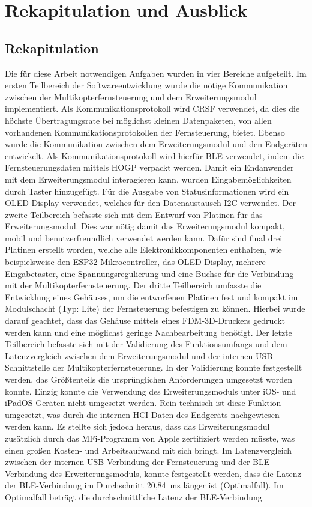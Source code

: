 
\chapter{Rekapitulation und Ausblick}
\section{Rekapitulation}

Die für diese Arbeit notwendigen Aufgaben wurden in vier Bereiche aufgeteilt. Im ersten Teilbereich der Softwareentwicklung wurde die nötige Kommunikation zwischen der Multikopterfernsteuerung und dem Erweiterungsmodul implementiert. Als Kommunikationsprotokoll wird CRSF verwendet, da dies die höchste Übertragungsrate bei möglichst kleinen Datenpaketen, von allen vorhandenen Kommunikationsprotokollen der Fernsteuerung, bietet. Ebenso wurde die Kommunikation zwischen dem Erweiterungsmodul und den Endgeräten entwickelt. Als Kommunikationsprotokoll wird hierfür \ac{BLE} verwendet, indem die Fernsteuerungsdaten mittels \ac{HOGP} verpackt werden. Damit ein Endanwender mit dem Erweiterungsmodul interagieren kann, wurden Eingabemöglichkeiten durch Taster hinzugefügt. Für die Ausgabe von Statusinformationen wird ein \acs{OLED}-Display verwendet, welches für den Datenaustausch \ac{I2C} verwendet. Der zweite Teilbereich befasste sich mit dem Entwurf von Platinen für das Erweiterungsmodul. Dies war nötig damit das Erweiterungsmodul kompakt, mobil und benutzerfreundlich verwendet werden kann. Dafür sind final drei Platinen erstellt worden, welche alle Elektronikkomponenten enthalten, wie beispielsweise den ESP32-Mikrocontroller, das \acs{OLED}-Display, mehrere Eingabetaster, eine Spannungsregulierung und eine Buchse für die Verbindung mit der Multikopterfernsteuerung. Der dritte Teilbereich umfasste die Entwicklung eines Gehäuses, um die entworfenen Platinen fest und kompakt im Modulschacht (Typ: Lite) der Fernsteuerung befestigen zu können. Hierbei wurde darauf geachtet, dass das Gehäuse mittels eines \ac{FDM}-3D-Druckers gedruckt werden kann und eine möglichst geringe Nachbearbeitung benötigt. Der letzte Teilbereich befasste sich mit der Validierung des Funktionsumfangs und dem Latenzvergleich zwischen dem Erweiterungsmodul und der internen USB-Schnittstelle der Multikopterfernsteuerung. In der Validierung konnte festgestellt werden, das Größtenteils die ursprünglichen Anforderungen umgesetzt worden konnte. Einzig konnte die Verwendung des Erweiterungsmoduls unter iOS- und iPadOS-Geräten nicht umgesetzt werden. Rein technisch ist diese Funktion umgesetzt, was durch die internen \ac{HCI}-Daten des Endgeräts nachgewiesen werden kann. Es stellte sich jedoch heraus, dass das Erweiterungsmodul zusätzlich durch das \ac{MFi}-Programm von Apple zertifiziert werden müsste, was einen großen Kosten- und Arbeitsaufwand mit sich bringt. Im Latenzvergleich zwischen der internen USB-Verbindung der Fernsteuerung und der \ac{BLE}-Verbindung des Erweiterungsmoduls, konnte festgestellt werden, dass die Latenz der \ac{BLE}-Verbindung im Durchschnitt 20,84~ms länger ist (Optimalfall). Im Optimalfall beträgt die durchschnittliche Latenz der \ac{BLE}-Verbindung 